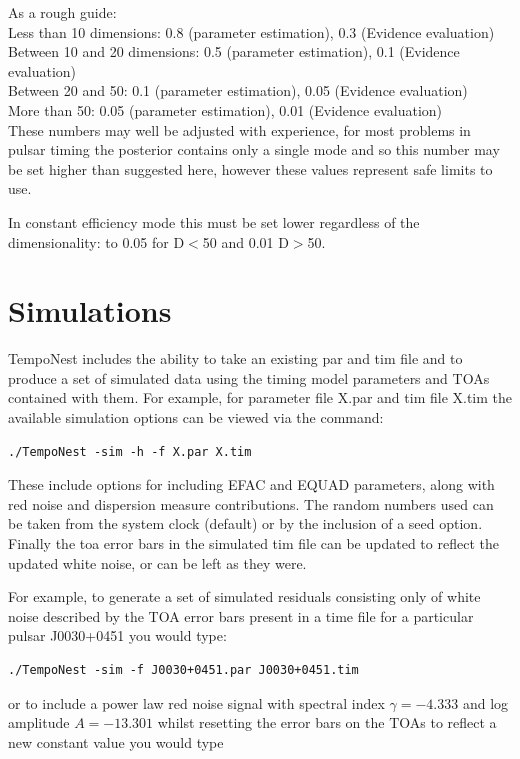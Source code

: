 \documentclass[%
 preprint,
 amsmath,amssymb,amsfonts,
 aps,
]{revtex4-1}
\begin{document}
As a rough guide:\\
%
Less than 10 dimensions: 0.8 (parameter estimation), 0.3 (Evidence evaluation) \\
Between 10 and 20 dimensions: 0.5 (parameter estimation), 0.1 (Evidence evaluation)\\
Between 20 and 50: 0.1 (parameter estimation), 0.05 (Evidence evaluation)\\
More than 50: 0.05 (parameter estimation), 0.01 (Evidence evaluation)\\

These numbers may well be adjusted with experience, for most problems in pulsar timing the posterior contains only a single mode and so this number may be set higher than suggested here, however these values represent safe limits to use.

In constant efficiency mode this must be set lower regardless of the dimensionality: to 0.05 for D$<$50 and 0.01 D$>$50.

\section{Simulations}
\label{Section:Sim}

TempoNest includes the ability to take an existing par and tim file and to produce a set of simulated data using the timing model parameters and TOAs contained with them.  For example, for parameter file X.par and tim file X.tim the available simulation options can be viewed via the command:

\begin{lstlisting}
./TempoNest -sim -h -f X.par X.tim
\end{lstlisting}

These include options for including EFAC and EQUAD parameters, along with red noise and dispersion measure contributions.  The random numbers used can be taken from the system clock (default) or by the inclusion of a seed option.  Finally the toa error bars in the simulated tim file can be updated to reflect the updated white noise, or can be left as they were.  

For example, to generate a set of simulated residuals consisting only of white noise described by the TOA error bars present in a time file for a particular pulsar J0030+0451 you would type:

\begin{lstlisting}
./TempoNest -sim -f J0030+0451.par J0030+0451.tim
\end{lstlisting}
%
or to include a power law red noise signal with spectral index $\gamma = -4.333$ and log amplitude $A=-13.301$ whilst resetting the error bars on the TOAs to reflect a new constant value you would type
\end{document}
